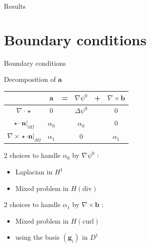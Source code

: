 \documentclass{beamer}
\newcommand{\grad}{{\nabla}}
\newcommand{\laplace}{{\Delta}}
\newcommand{\curl}{{\nabla\times}}
\renewcommand{\div}{{\nabla\cdot}}
\newcommand{\restr}{{\big\rvert_{\partial\Omega}}}
\begin{document}
\begin{frame}{Results}
\begin{figure}[H]
{    }
  \end{figure}
\end{frame}

\section{Boundary conditions}
\begin{frame}{Boundary conditions}
\label{psi0}
\begin{block}{Decomposition of $\mathbf{a}$}
\begin{center}
\begin{tabular}{c|ccccc}
& $\mathbf{a}$ & = & $\grad\psi^0$ & + & $\curl \mathbf{b}$ \\ \hline
$\div\star$ & 0 & & $\laplace\psi^0$ & & 0\\ \hline
$\star\cdot \mathbf{n}\restr$ & $\alpha_0$ & & $\alpha_0$ & & 0\\ \hline
$\curl\star\cdot \mathbf{n}\restr$ & $\alpha_1$ & & 0 & & $\alpha_1$
\end{tabular}
\end{center}
\end{block}
2 choices to handle $\alpha_0$ by $\grad\psi^0$ :
\begin{itemize}
\item Laplacian in $H^1$
\item Mixed problem in $H(\mathrm{div})$
\end{itemize}
2 choices to handle $\alpha_1$ by $\curl\mathbf{b}$ :
\begin{itemize}
\item Mixed problem in $H(\mathrm{curl})$
\item using the basis $(\mathbf{g}_i)$ in $D^1$
\end{itemize}
\end{frame}
\end{document}
